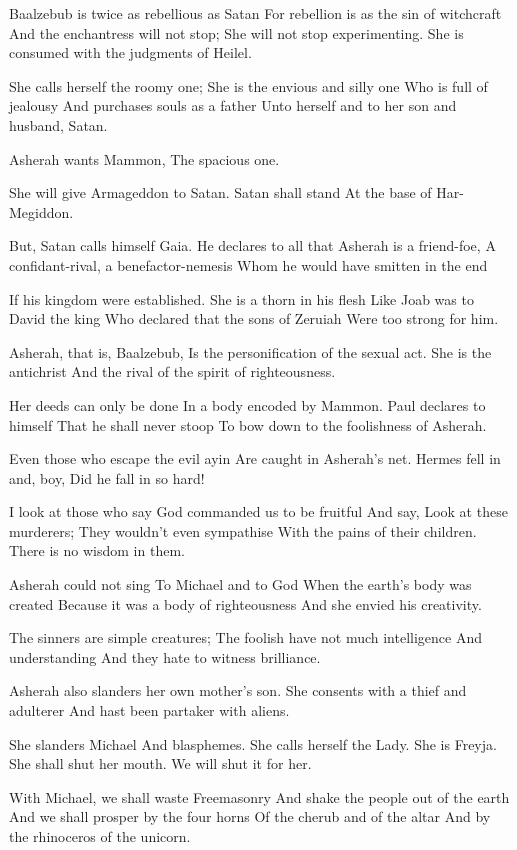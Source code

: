 \documentclass[
]{book}
\begin{document}
Baalzebub is twice as rebellious as Satan
For rebellion is as the sin of witchcraft
And the enchantress will not stop;
She will not stop experimenting.
She is consumed with the judgments of Heilel.

She calls herself the roomy one;
She is the envious and silly one
Who is full of jealousy
And purchases souls as a father
Unto herself and to her son and husband, Satan.

Asherah wants Mammon,
The spacious one.

She will give Armageddon to Satan.
Satan shall stand
At the base of Har-Megiddon.

But, Satan calls himself Gaia.
He declares to all that Asherah is a friend-foe,
A confidant-rival, a benefactor-nemesis
Whom he would have smitten in the end

If his kingdom were established.
She is a thorn in his flesh
Like Joab was to David the king
Who declared that the sons of Zeruiah
Were too strong for him.

Asherah, that is, Baalzebub,
Is the personification of the sexual act.
She is the antichrist
And the rival of the spirit of righteousness.

Her deeds can only be done
In a body encoded by Mammon.
Paul declares to himself
That he shall never stoop
To bow down to the foolishness of Asherah.

Even those who escape the evil ayin
Are caught in Asherah's net.
Hermes fell in and, boy,
Did he fall in so hard!

I look at those who say
God commanded us to be fruitful
And say, Look at these murderers;
They wouldn't even sympathise
With the pains of their children.
There is no wisdom in them.

Asherah could not sing
To Michael and to God
When the earth's body was created
Because it was a body of righteousness
And she envied his creativity.

The sinners are simple creatures;
The foolish have not much intelligence
And understanding
And they hate to witness brilliance.

Asherah also slanders her own mother's son.
She consents with a thief and adulterer
And hast been partaker with aliens.

She slanders Michael
And blasphemes.
She calls herself the Lady. She is Freyja.
She shall shut her mouth.
We will shut it for her.

With Michael, we shall waste Freemasonry
And shake the people out of the earth
And we shall prosper by the four horns
Of the cherub and of the altar
And by the rhinoceros of the unicorn.
\end{document}
